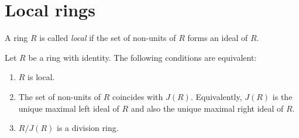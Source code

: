 \section{Local rings}

\begin{definition}
    A ring $R$ is called \emph{local} if the set of non-units of $R$ forms an ideal of $R$.
\end{definition}

\begin{theorem}
    Let $R$ be a ring with identity. The following conditions are equivalent:
    \begin{enumerate}
        \item $R$ is local.
        \item The set of non-units of $R$ coincides with $J(R)$. Equivalently,
              $J(R)$ is the unique maximal left ideal of $R$ and also the unique
              maximal right ideal of $R$.
        \item $R/J(R)$ is a division ring.
    \end{enumerate}
\end{theorem}

